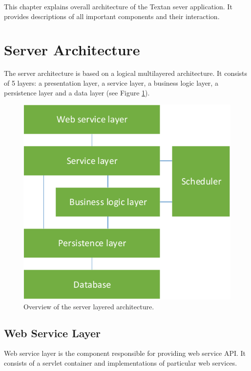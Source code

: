 
This chapter explains overall architecture of the Textan sever application. It
provides descriptions of all important components and their interaction.

\section{Server Architecture}

The server architecture is based on a logical multilayered architecture. It
consists of 5 layers: a presentation layer, a service layer, a business logic
layer, a persistence layer and a data layer (see Figure
\ref{fig:ServerComponentOverview}).

\begin{figure}[!htb]
        \centering
        \includegraphics{Images/ServerComponentOverview}
        \caption{Overview of the server layered architecture.}
        \label{fig:ServerComponentOverview}
\end{figure}

\subsection{Web Service Layer}

Web service layer is the component responsible for providing web service
API. It consists of a servlet container and implementations of particular
web services.

